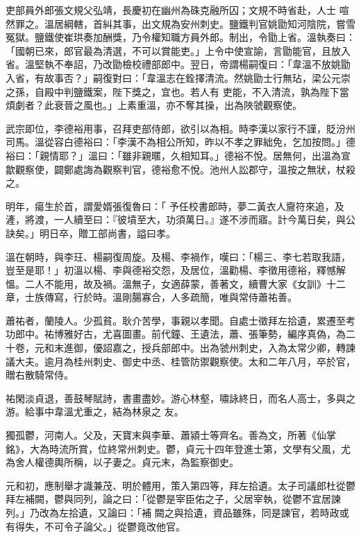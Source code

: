 \begin{pinyinscope}
 吏部員外郎張文規父弘靖，長慶初在幽州為硃克融所囚；文規不時省赴，人士
 喧然罪之。溫居綱轄，首糾其事，出文規為安州刺史。鹽鐵判官姚勖知河陰院，嘗雪冤獄。鹽鐵使崔珙奏加酬獎，乃令權知職方員外郎。制出，令勖上省。溫執奏曰：「國朝已來，郎官最為清選，不可以賞能吏。」上令中使宣諭，言勖能官，且放入省。溫堅執不奉詔，乃改勖檢校禮部郎中。翌日，帝謂楊嗣復曰：「韋溫不放姚勖入省，有故事否？」嗣復對曰：「韋溫志在銓擇清流。然姚勖士行無玷，梁公元崇之孫，自殿中判鹽鐵案，陛下獎之，宜也。若人有
 吏能，不入清流，孰為陛下當煩劇者？此衰晉之風也。」上素重溫，亦不奪其操，出為陜虢觀察使。



 武宗即位，李德裕用事，召拜吏部侍郎，欲引以為相。時李漢以家行不謹，貶汾州司馬。溫從容白德裕曰：「李漢不為相公所知，昨以不孝之罪絀免，乞加按問。」德裕曰：「親情耶？」溫曰：「雖非親暱，久相知耳。」德裕不悅。居無何，出溫為宣歙觀察使，闢鄭處誨為觀察判官，德裕愈不悅。池州人訟郡守，溫按之無狀，杖殺之。



 明年，瘍生於首，謂愛婿張復魯曰：「
 予任校書郎時，夢二黃衣人齎符來追，及滻，將渡，一人續至曰：『彼墳至大，功須萬日。』遂不涉而寤。計今萬日矣，與公訣矣。」明日卒，贈工部尚書，謚曰孝。



 溫在朝時，與李玨、楊嗣復周旋。及楊、李禍作，嘆曰：「楊三、李七若取我語，豈至是耶！」初溫以楊、李與德裕交怨，及居位，溫勸楊、李徵用德裕，釋憾解慍。二人不能用，故及禍。溫無子，女適薛蒙，善著文，續曹大家《女訓》十二章，士族傳寫，行於時。溫剛腸寡合，人多疏簡，唯與常侍蕭祐善。



 蕭祐者，蘭陵人。少孤貧。耿介苦學，事親以孝聞。自處士徵拜左拾遺，累遷至考功郎中。祐博雅好古，尤喜圖畫。前代鐘、王遺法，蕭、張筆勢，編序真偽，為二十卷，元和末進御，優詔嘉之，授兵部郎中。出為虢州刺史，入為太常少卿，轉諫議大夫。逾月為桂州刺史、御史中丞、桂管防禦觀察使。太和二年八月，卒於官，贈右散騎常侍。



 祐閑淡貞退，善鼓琴賦詩，書畫盡妙。游心林壑，嘯詠終日，而名人高士，多與之游。給事中韋溫尤重之，結為林泉之
 友。



 獨孤鬱，河南人。父及，天寶末與李華、蕭潁士等齊名。善為文，所著《仙掌銘》，大為時流所賞，位終常州刺史。鬱，貞元十四年登進士第，文學有父風，尤為舍人權德輿所稱，以子妻之。貞元末，為監察御史。



 元和初，應制舉才識兼茂、明於體用，策入第四等，拜左拾遺。太子司議郎杜從鬱拜左補闕，鬱與同列，論之曰：「從鬱是宰臣佑之子，父居宰執，從鬱不宜居諫列。」乃改為左拾遺，又論曰：「補
 闕之與拾遺，資品雖殊，同是諫官，若時政或有得失，不可令子論父。」從鬱竟改他官。




\end{pinyinscope}
